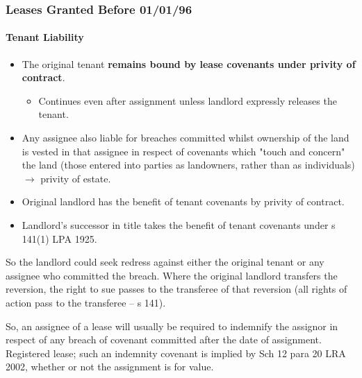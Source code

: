 \documentclass[
]{article}
\providecommand{\tightlist}{%
  \setlength{\itemsep}{0pt}\setlength{\parskip}{0pt}}
\begin{document}
\hypertarget{leases-granted-before-010196}{%
\subsubsection{Leases Granted Before
01/01/96}\label{leases-granted-before-010196}}

\hypertarget{tenant-liability}{%
\paragraph{Tenant Liability}\label{tenant-liability}}

\begin{itemize}
\tightlist
\item
  The original tenant \textbf{remains bound by lease covenants under
  privity of contract}.

  \begin{itemize}
  \tightlist
  \item
    Continues even after assignment unless landlord expressly releases
    the tenant.
  \end{itemize}
\item
  Any assignee also liable for breaches committed whilst ownership of
  the land is vested in that assignee in respect of covenants which
  "touch and concern" the land (those entered into parties as
  landowners, rather than as individuals) {\(\rightarrow\)} privity of
  estate.
\item
  Original landlord has the benefit of tenant covenants by privity of
  contract.
\item
  Landlord's successor in title takes the benefit of tenant covenants
  under s 141(1) LPA 1925.
\end{itemize}

So the landlord could seek redress against either the original tenant or
any assignee who committed the breach. Where the original landlord
transfers the reversion, the right to sue passes to the transferee of
that reversion (all rights of action pass to the transferee -- s 141).

So, an assignee of a lease will usually be required to indemnify the
assignor in respect of any breach of covenant committed after the date
of assignment. Registered lease; such an indemnity covenant is implied
by Sch 12 para 20 LRA 2002, whether or not the assignment is for value.
\end{document}
